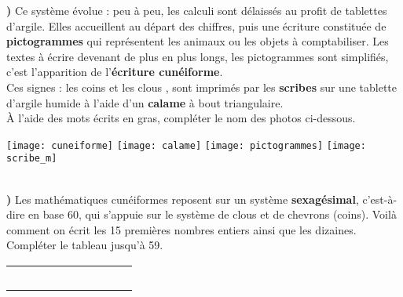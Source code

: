 \documentclass[12pt,a4paper]{article}
\newcommand{\babun}{{\AKK\dish}}
\newcommand{\babdeux}{{\AKK\min}}
\newcommand{\babtrois}{{\AKK\eshV}}
\newcommand{\babquatre}{{\AKK\shaII}}
\newcommand{\babcinq}{{\AKK\iaII}}
\newcommand{\babsix}{{\AKK\ashIII}}
\newcommand{\babsept}{{\AKK\imin}}
\newcommand{\babhuit}{{\AKK\ussu}}
\newcommand{\babneuf}{{\AKK\geshilimmu}}
\newcommand{\babdix}{{\AKK\AKKu}}
\newcommand{\babvingt}{{\AKK\man}}
\newcommand{\babtrente}{{\AKK\esh}}
\newcommand{\babquarante}{{\AKK\ninV}}
\newcommand{\babcinquante}{{\AKK\ninnu}}
\begin{document}
\pagebreak
\thispagestyle{empty}

{\bf{})} Ce système évolue : peu à peu, les  calculi sont délaissés au profit de tablettes d’argile. Elles accueillent au départ des chiffres, puis une écriture constituée de {\bf pictogrammes} qui représentent les animaux ou les objets à comptabiliser. Les textes à écrire devenant de plus en plus longs, les pictogrammes sont simplifiés, c'est l’apparition de l'{\bf écriture cunéiforme}. \\
Ces signes : les coins \babdix et les clous \babun, sont imprimés par les {\bf scribes} sur une tablette d’argile humide à l’aide d’un {\bf calame} à bout triangulaire. \\
À l'aide des mots écrits en gras, compléter le nom des photos ci-dessous.
\begin{center}
   \texttt{[image: cuneiforme]} \qquad \texttt{[image: calame]} \qquad \texttt{[image: pictogrammes]} \qquad \texttt{[image: scribe\_m]}
\end{center}
   \mbox{} \quad {} \quad {} \quad {} \\

{\bf{})} Les mathématiques cunéiformes reposent sur un système {\bf sexagésimal}, c’est-à-dire en base 60, qui s’appuie sur le système de clous et de chevrons (coins). Voilà comment on écrit les 15 premières nombres entiers ainsi que les dizaines. Compléter le tableau jusqu'à 59.

\begin{center}
\begin{tabular}{|*{10}{C{1.2}|}}
   \hline
   & \babun
   & \babdeux
   & \babtrois
   & \babquatre
   & \babcinq
   & \babsix
   & \babsept
   & \babhuit
   & \babneuf
   \\
   \hline
   \babdix
   & \babdix\!\!\!\babun
   & \babdix\!\!\!\babdeux
   & \babdix\!\!\!\babtrois
   & \babdix\!\!\!\babquatre
   & \babdix\!\!\!\babcinq
   & & & & \\
   \hline
   \babvingt & & & & & & & & & \\
   \hline
   \babtrente & & & & & & & & & \\
   \hline
   \babquarante & & & & & & & & & \\
   \hline
   \babcinquante & & & & & & & & & \\
   \hline
\end{tabular}
\end{center}
\end{document}
